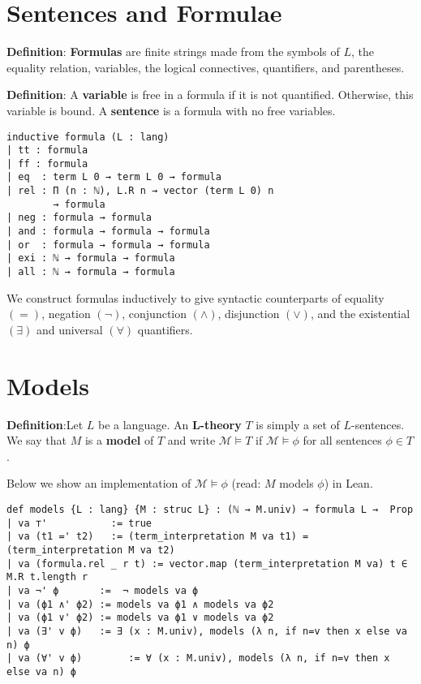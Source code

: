 \documentclass[landscape]{sciposter}
\begin{document}
\begin{multicols}{3}
\section*{Sentences and Formulae}

\textbf{Definition}: \textbf{Formulas} are finite strings made from the symbols of \(L\), the equality relation, variables, the logical connectives, quantifiers, and parentheses.

\textbf{Definition}: A \textbf{variable} is free in a formula if it is not quantified. Otherwise, this variable is bound. A \textbf{sentence} is a formula with no free variables.
\begin{lstlisting}
inductive formula (L : lang)
| tt : formula
| ff : formula
| eq  : term L 0 → term L 0 → formula
| rel : Π (n : ℕ), L.R n → vector (term L 0) n
        → formula
| neg : formula → formula
| and : formula → formula → formula
| or  : formula → formula → formula
| exi : ℕ → formula → formula
| all : ℕ → formula → formula
\end{lstlisting}
We construct formulas inductively to give syntactic counterparts of equality $(=)$, negation $(\neg)$, conjunction $(\wedge)$, disjunction $(\vee)$, and the existential $(\exists)$ and universal $(\forall)$ quantifiers.

\section*{Models}

\textbf{Definition}:Let $L$ be a language. An \textbf{L-theory} \(T\) is simply a set of $L$-sentences.
We say that \(M\) is a \textbf{model} of \(T\) and write $\mathcal{M} \models T$ if $\mathcal{M} \models \phi$ for all sentences \(\phi \in T\).

Below we show an implementation of $\mathcal{M} \models \phi$ (read: \(M\) models \(\phi\)) in Lean.

\begin{lstlisting}
def models {L : lang} {M : struc L} : (ℕ → M.univ) → formula L →  Prop
| va ⊤'           := true
| va (t1 =' t2)   := (term_interpretation M va t1) = (term_interpretation M va t2)
| va (formula.rel _ r t) := vector.map (term_interpretation M va) t ∈ M.R t.length r
| va ¬' ϕ       :=  ¬ models va ϕ
| va (ϕ1 ∧' ϕ2) := models va ϕ1 ∧ models va ϕ2
| va (ϕ1 ∨' ϕ2) := models va ϕ1 ∨ models va ϕ2
| va (∃' v ϕ)   := ∃ (x : M.univ), models (λ n, if n=v then x else va n) ϕ
| va (∀' v ϕ)        := ∀ (x : M.univ), models (λ n, if n=v then x else va n) ϕ
\end{lstlisting}


\end{multicols}
\end{document}
